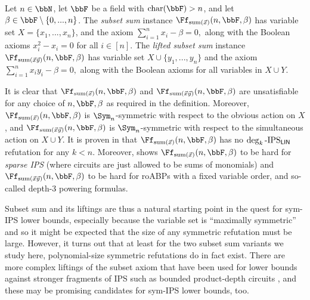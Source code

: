 \documentclass[a4paper,UKenglish,cleveref, autoref, thm-restate]{lipics-v2021}
\newcommand{\IPSlin}{\text{\upshape IPS}_{\mathsf{LIN}}}
\begin{document}
\begin{definition}
	Let $n \in \bbN$, let $\bbF$ be a field with $\text{char}(\bbF) > n$, and let $\beta \in \bbF \setminus \{0,...,n\}$. The \emph{subset sum} instance $\Ff_{\text{sum}(\vec x)}(n,\bbF,\beta)$ has variable set
	$X = \{x_1,...,x_n\}$, and the axiom
	$
	\sum_{i=1}^n x_i - \beta = 0,
	$
	along with the Boolean axioms $x_i^2 - x_i = 0$ for all $i \in [n]$.
	The \emph{lifted subset sum} instance $\Ff_{\text{sum}(\vec x\vec y)}(n,\bbF,\beta)$ has variable set $X \cup \{y_1,...,y_n\}$ and the axiom 	$
	\sum_{i=1}^n x_iy_i- \beta = 0,
	$
	along with the Boolean axioms for all variables in $X \cup Y$.
\end{definition}	
It is clear that $\Ff_{\text{sum}(\vec x)}(n,\bbF,\beta)$ and $\Ff_{\text{sum}(\vec x \vec y)}(n,\bbF,\beta)$ are unsatisfiable for any choice of $n, \bbF, \beta$ as required in the definition. Moreover, $\Ff_{\text{sum}(\vec x)}(n,\bbF,\beta)$ is $\Sym_n$-symmetric with respect to the obvious action on $X$, and $\Ff_{\text{sum}(\vec x\vec y)}(n,\bbF,\beta)$ is $\Sym_n$-symmetric with respect to the simultaneous action on $X \cup Y$.
It is proven in \cite[Proposition 5.3]{lowerbounds_IPS} that $\Ff_{\text{sum}(\vec x)}(n,\bbF,\beta)$ has no $\deg_k\text{-}\IPSlin$ refutation for any $k < n$.
Moreover, \cite{lowerbounds_IPS} shows $\Ff_{\text{sum}(\vec x)}(n,\bbF,\beta)$ to be hard for \emph{sparse IPS} (where circuits are just allowed to be sums of monomials) and $\Ff_{\text{sum}(\vec x \vec y)}(n,\bbF,\beta)$ to be hard for roABPs with a fixed variable order, and so-called depth-3 powering formulas.


Subset sum and its liftings are thus a natural starting point in the quest for sym-IPS lower bounds, especially because the variable set is ``maximally symmetric'' and so it might be expected that the size of any symmetric refutation must be large. However, it turns out that at least for the two subset sum variants we study here, polynomial-size symmetric refutations do in fact exist. 
There are more complex liftings of the subset axiom that have been used for lower bounds against stronger fragments of IPS such as bounded product-depth circuits
\cite{govindasamy2022simple, hakoniemi2024functional}, and these may be promising candidates for sym-IPS lower bounds, too.
\end{document}
